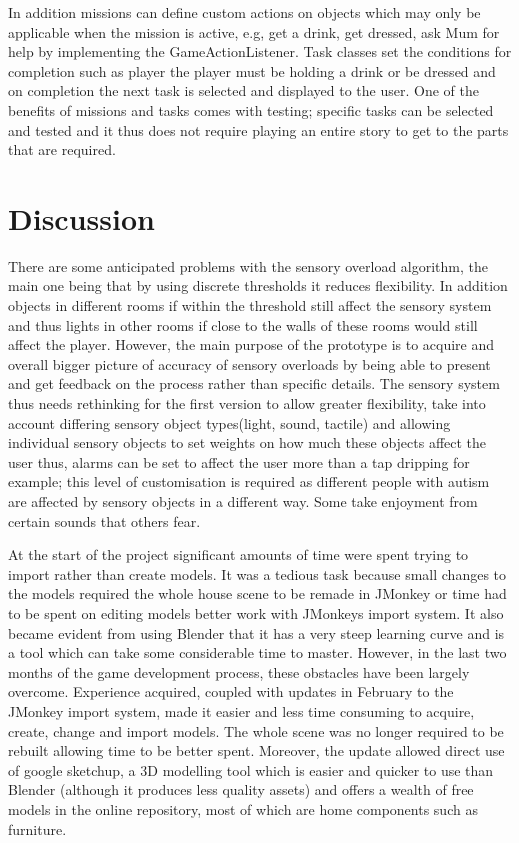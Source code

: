 \documentclass[11pt]{report}
\begin{document}
In addition missions can define custom actions on objects which may only be applicable when the mission is active, e.g, get a drink, get dressed, ask Mum for help by implementing the GameActionListener. Task classes set the conditions for completion such as player the player must be holding a drink or be dressed and on completion the next task is selected and displayed to the user. One of the benefits of missions and tasks comes with testing; specific tasks can be selected and tested and it thus does not require playing an entire story to get to the parts that are required.

\section{Discussion}
\label{sec:p_imp_discussion}
There are some anticipated problems with the sensory overload algorithm, the main one being that by using discrete thresholds it reduces flexibility. In addition objects in different rooms if within the threshold still affect the sensory system and thus lights in other rooms if close to the walls of these rooms would still affect the player. 
However, the main purpose of the prototype is to acquire and overall bigger picture of accuracy of sensory overloads by being able to present and get feedback on the process rather than specific details. The sensory system thus needs rethinking for the first version to allow greater flexibility, take into account differing sensory object types(light, sound, tactile) and allowing individual sensory objects to set weights on how much these objects affect the user thus, alarms can be set to affect the user more than a tap dripping for example; this level of customisation is required as different people with autism are affected by sensory objects in a different way. Some take enjoyment from certain sounds that others fear. 

At the start of the project significant amounts of time were spent trying to import rather than create models. It was a tedious task because small changes to the models required the whole house scene to be remade in JMonkey or
time had to be spent on editing models better work with JMonkeys import system. It also became evident from using Blender that it has a very steep learning curve and is a tool which can take some considerable time to master.
However, in the last two months of the game development process, these obstacles have been largely overcome. Experience acquired, coupled with updates in February to the JMonkey import system, made it easier and less
time consuming to acquire, create, change and import models. The whole scene was no longer required to be rebuilt allowing time to be better spent. Moreover, the update allowed direct use of google sketchup, a 3D modelling
tool which is easier and quicker to use than Blender (although it produces less quality assets) and offers a wealth of free models in the online repository, most of which are home components such as furniture.
\end{document}
